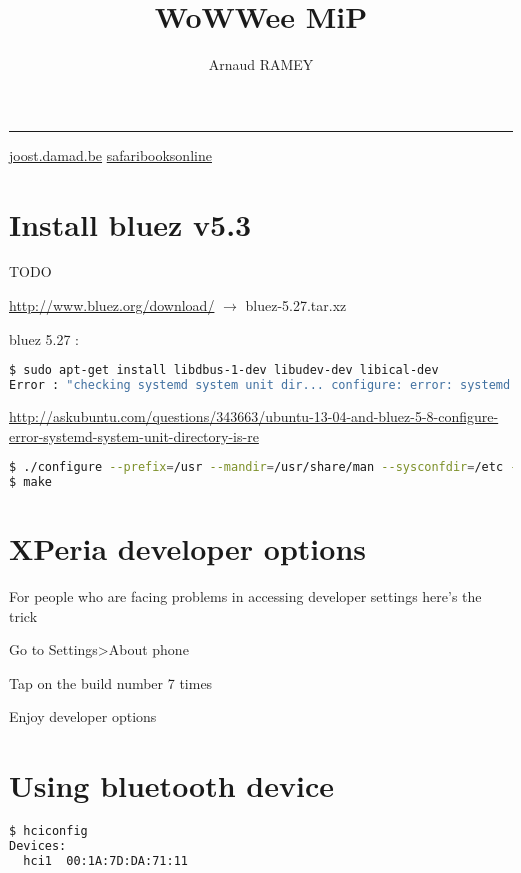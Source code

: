 \documentclass[a4paper,10pt]{article}
\title{WoWWee MiP}
\author{Arnaud RAMEY}
\newcommand{\link}[1] {\href{#1}{#1}}
\begin{document}
\maketitle
\tableofcontents
\hrule
\vspace{5 mm}

\href{http://joost.damad.be/2013/08/experiments-with-bluetooth-low-energy.html}
     {joost.damad.be}
\href{https://www.safaribooksonline.com/library/view/getting-started-with/9781491900550/ch04.html}
 {safaribooksonline}

\section{Install bluez v5.3}
TODO

\link{http://www.bluez.org/download/} $\rightarrow$ bluez-5.27.tar.xz

bluez 5.27 : 
\begin{lstlisting}[language=bash]
$ sudo apt-get install libdbus-1-dev libudev-dev libical-dev
Error : "checking systemd system unit dir... configure: error: systemd system unit directory is required"
\end{lstlisting}
\link{http://askubuntu.com/questions/343663/ubuntu-13-04-and-bluez-5-8-configure-error-systemd-system-unit-directory-is-re}
\begin{lstlisting}[language=bash]
$ ./configure --prefix=/usr --mandir=/usr/share/man --sysconfdir=/etc --localstatedir=/var --enable-experimental --with-systemdsystemunitdir=/lib/systemd/system --with-systemduserunitdir=/usr/lib/systemd
$ make
\end{lstlisting}

\section{XPeria developer options}
For people who are facing problems in accessing developer settings here's the trick 

Go to Settings>About phone

Tap on the build number 7 times 

Enjoy developer options 

\section{Using bluetooth device}
\begin{lstlisting}[language=bash]
$ hciconfig
Devices:
  hci1  00:1A:7D:DA:71:11 
\end{lstlisting}
\end{document}
